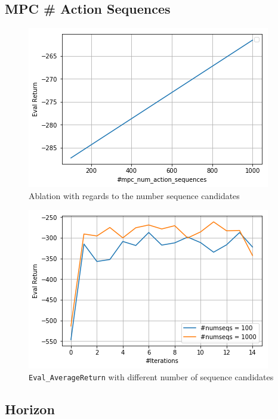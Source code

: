 \documentclass[11pt]{article}
\begin{document}
\subsection{MPC \# Action Sequences}
\label{sec:org823ab9c}
\begin{figure}[htbp]
\centering
\includegraphics[width=.9\linewidth]{./numseqs.png}
\caption{Ablation with regards to the number sequence candidates}
\end{figure}

\begin{figure}[htbp]
\centering
\includegraphics[width=.9\linewidth]{./numseqs_eval.png}
\caption{\texttt{Eval\_AverageReturn} with different number of sequence candidates}
\end{figure}

\clearpage

\subsection{Horizon}
\label{sec:orgf0cac6d}
\end{document}
